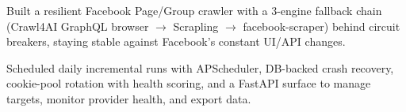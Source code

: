 
\vspace{3pt}
\begin{resume_list}
  \item Built a resilient Facebook Page/Group crawler with a 3-engine fallback chain (Crawl4AI GraphQL browser $\rightarrow$ Scrapling $\rightarrow$ facebook-scraper) behind circuit breakers, staying stable against Facebook's constant UI/API changes.
  \item Scheduled daily incremental runs with APScheduler, DB-backed crash recovery, cookie-pool rotation with health scoring, and a FastAPI surface to manage targets, monitor provider health, and export data.
\end{resume_list}
